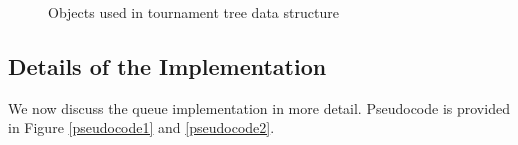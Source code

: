 \begin{figure}
\begin{algorithmic}[1]



\end{algorithmic}
\caption{Objects used in tournament tree data structure \label{object-fields}}
\end{figure}

\subsection{Details of the Implementation}

We now discuss the queue implementation in more detail.  Pseudocode is provided in Figure \ref{pseudocode1} and \ref{pseudocode2}.


